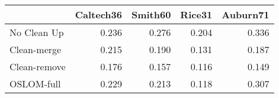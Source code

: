\begin{tabular}{lrrrr}
\toprule
{} & Caltech36 & Smith60 & Rice31 & Auburn71 \\
\midrule
No Clean Up  &     0.236 &   0.276 &  0.204 &    0.336 \\
Clean-merge  &     0.215 &   0.190 &  0.131 &    0.187 \\
Clean-remove &     0.176 &   0.157 &  0.116 &    0.149 \\
OSLOM-full   &     0.229 &   0.213 &  0.118 &    0.307 \\
\bottomrule
\end{tabular}

